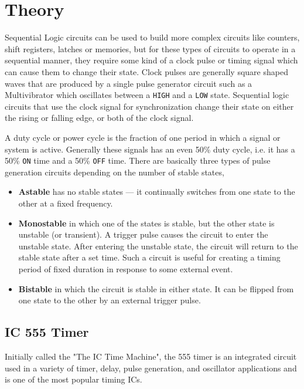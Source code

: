 \section{Theory}

Sequential Logic circuits can be used to build more complex circuits like counters, shift registers, latches or memories, but for these types of circuits to operate in a sequential manner, they require some kind of a clock pulse or timing signal which can cause them to change their state. Clock pulses are generally square shaped waves that
are produced by a single pulse generator circuit such as a Multivibrator which oscillates
between a \verb|HIGH| and a \verb|LOW| state. Sequential logic circuits that use the
clock signal for synchronization change their state on either the rising or falling
edge, or both of the clock signal.

A duty cycle or power cycle is the fraction of one period in which a signal or system is active. Generally these signals has an even 50\% duty cycle, i.e.
it has a 50\% \verb|ON| time and a 50\% \verb|OFF| time.  There are basically three types of pulse
generation circuits depending on the number of stable states,

\begin{itemize}
    \item \textbf{Astable} has no stable states — it continually switches from one state to the other at a fixed frequency.
    \item \textbf{Monostable} in which one of the states is stable, but the other state is unstable (or transient). A trigger pulse causes the circuit to enter the unstable state. After entering the unstable state, the circuit will return to the stable state after a set time. Such a circuit is useful for creating a timing period of fixed duration in response to some external event.
    \item \textbf{Bistable} in which the circuit is stable in either state. It can be flipped from one state to the other by an external trigger pulse.
\end{itemize}

\subsection*{IC 555 Timer}
Initially called the "The IC Time Machine", the 555 timer is an integrated circuit used in a variety of timer, delay, pulse generation, and oscillator applications and is one of the most popular timing ICs.

